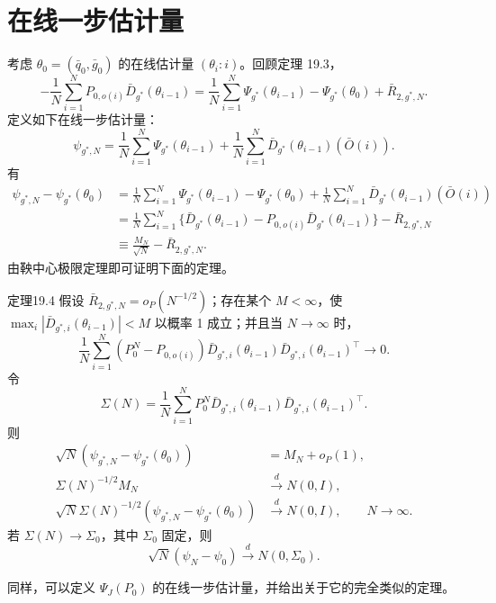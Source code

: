 \section{在线一步估计量}

考虑 $\theta_0=(\bar q_0,\bar g_0)$ 的在线估计量 $(\theta_i:i)$。回顾定理 19.3，
\[
 -\frac1N\sum_{i=1}^N P_{0,o(i)}\bar D_{g^*}(\theta_{i-1})
 =\frac1N\sum_{i=1}^N\Psi_{g^*}(\theta_{i-1})
 -\Psi_{g^*}(\theta_0)+\bar R_{2,g^*,N}.
\]
定义如下在线一步估计量：
\[
 \psi_{g^*,N}=\frac1N\sum_{i=1}^N\Psi_{g^*}(\theta_{i-1})
 +\frac1N\sum_{i=1}^N\bar D_{g^*}(\theta_{i-1})(\bar O(i)).
\]
有
\[
\begin{aligned}
 \psi_{g^*,N}-\psi_{g^*}(\theta_0)
 &=\frac1N\sum_{i=1}^N\Psi_{g^*}(\theta_{i-1})-\Psi_{g^*}(\theta_0)
 +\frac1N\sum_{i=1}^N\bar D_{g^*}(\theta_{i-1})(\bar O(i))\\
 &=\frac1N\sum_{i=1}^N
 \{\bar D_{g^*}(\theta_{i-1})-P_{0,o(i)}\bar D_{g^*}(\theta_{i-1})\}
 -\bar R_{2,g^*,N}\\
 &\equiv\frac{M_N}{\sqrt N}-\bar R_{2,g^*,N}.
\end{aligned}
\]
由鞅中心极限定理即可证明下面的定理。

\begin{bookresult}{定理}{19.4}
假设 $\bar R_{2,g^*,N}=o_P(N^{-1/2})$；存在某个 $M<\infty$，使 $\max_i|\bar D_{g^*,i}(\theta_{i-1})|<M$ 以概率 1 成立；并且当 $N\to\infty$ 时，
\[
 \frac1N\sum_{i=1}^N(P_0^N-P_{0,o(i)})
 \bar D_{g^*,i}(\theta_{i-1})\bar D_{g^*,i}(\theta_{i-1})^\top\to0.
\]
令
\[
 \Sigma(N)=\frac1N\sum_{i=1}^N P_0^N
 \bar D_{g^*,i}(\theta_{i-1})\bar D_{g^*,i}(\theta_{i-1})^\top.
\]
则
\[
\begin{aligned}
 \sqrt N(\psi_{g^*,N}-\psi_{g^*}(\theta_0))&=M_N+o_P(1),\\
 \Sigma(N)^{-1/2}M_N&\xrightarrow{d}N(0,I),\\
 \sqrt N\Sigma(N)^{-1/2}(\psi_{g^*,N}-\psi_{g^*}(\theta_0))
 &\xrightarrow{d}N(0,I),\qquad N\to\infty.
\end{aligned}
\]
若 $\Sigma(N)\to\Sigma_0$，其中 $\Sigma_0$ 固定，则
\[
 \sqrt N(\psi_N-\psi_0)\xrightarrow{d}N(0,\Sigma_0).
\]
\end{bookresult}

同样，可以定义 $\Psi_J(P_0)$ 的在线一步估计量，并给出关于它的完全类似的定理。

